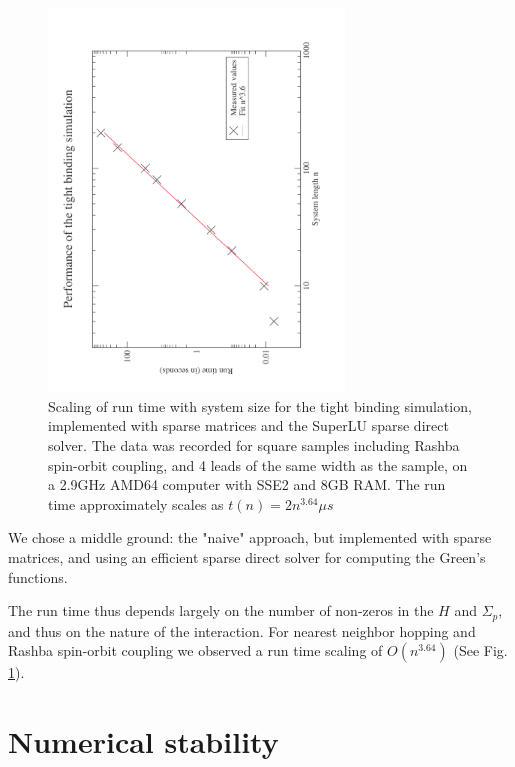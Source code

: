 \begin{figure}
    \begin{center}
    \includegraphics[angle=270,width=0.7\textwidth]{scaling.pdf}
    \end{center}
    \caption{Scaling of run time with system size for the tight binding
        simulation, implemented with sparse matrices and the SuperLU sparse
        direct solver. The data was recorded for square samples including
        Rashba spin-orbit coupling, and 4 leads of the same width as the
        sample, on a 2.9GHz AMD64 computer with SSE2 and 8GB RAM.
        The run time approximately scales as $t(n) = 2
        n^{3.64}\mu s$}
        \label{fig:scaling}
\end{figure}

We chose a middle ground: the "naive" approach, but implemented with sparse
matrices, and using an efficient sparse direct solver\cite{superlu99} for
computing the Green's functions.

The run time thus depends largely on the number of non-zeros in the $H$ and
$\Sigma_p$, and thus on the nature of the interaction. For nearest neighbor
hopping and Rashba spin-orbit coupling we observed a run time scaling of
$O(n^{3.64})$ (See Fig. \ref{fig:scaling}).

\section{Numerical stability}

